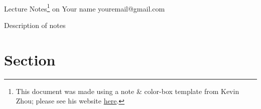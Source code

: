 \documentclass[11pt]{article}
\begin{document}
\thispagestyle{empty}
\bigskip \
\vspace{0.1cm}

\begin{center}
{\fontsize{22}{22} \selectfont Lecture Notes\footnote{This document was made using a note \& color-box template from Kevin Zhou;
please see his website \href{https://knzhou.github.io}{here}.} on} %
\vskip 16pt
{\fontsize{36}{36} \selectfont \bf \sffamily [subject]}
\vskip 24pt
{\fontsize{18}{18} \selectfont \rmfamily Your name} 
\vskip 6pt
{\fontsize{14}{14} \selectfont \ttfamily youremail@gmail.com} 
\vskip 24pt
\end{center}

{\parindent0pt \baselineskip=15.5pt}
\noin
Description of notes

\newpage
\microtoc
\newpage

\section{Section}
\end{document}
